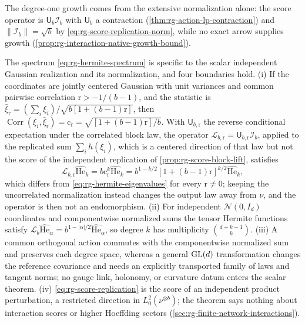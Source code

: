 The degree-one growth comes from the extensive normalization alone: the score
operator is \(\mathsf U_b\mathscr I_b\) with \(\mathsf U_b\) a contraction
(\cref{thm:rg-action-lp-contraction}) and
\(\lVert\mathscr I_b\rVert=\sqrt b\) by \eqref{eq:rg-score-replication-norm},
while no exact arrow supplies growth
(\cref{prop:rg-interaction-native-growth-bound}).

The spectrum \eqref{eq:rg-hermite-spectrum} is specific to the scalar
independent Gaussian realization and its normalization, and four boundaries
hold. (i) If the coordinates are jointly centered Gaussian with unit variances
and common pairwise correlation \(\mathrm r>-1/(b-1)\), and the statistic is
\(\bar\xi_{\mathrm r}=(\sum_i\xi_i)/\sqrt{b[1+(b-1)\mathrm r]}\), then
\(\operatorname{Corr}(\xi_i,\bar\xi_{\mathrm r})=\mathrm c_{\mathrm r}=\sqrt{[1+(b-1)\mathrm r]/b}\).
With \(\mathsf U_{b,\mathrm r}\) the reverse conditional expectation under the
correlated block law, the operator
\(\mathscr L_{b,\mathrm r}=\mathsf U_{b,\mathrm r}\mathscr I_b\), applied to the
replicated sum \(\sum_ih(\xi_i)\), which is a centered direction of that law but
not the score of the independent replication of
\cref{prop:rg-score-block-lift}, satisfies
\begin{equation}
\mathscr L_{b,\mathrm r}\widehat{\mathrm{He}}_k=b\mathrm c_{\mathrm r}^k\widehat{\mathrm{He}}_k
=b^{1-k/2}\left[1+(b-1)\mathrm r\right]^{k/2}\widehat{\mathrm{He}}_k,
\label{eq:rg-hermite-correlated}
\end{equation}
which differs from \eqref{eq:rg-hermite-eigenvalues} for every
\(\mathrm r\neq0\); keeping the uncorrelated normalization instead changes the
output law away from \(\nu\), and the operator is then not an endomorphism.
(ii) For independent \(\mathcal N(0,I_d)\) coordinates and componentwise normalized
sums the tensor Hermite functions satisfy
\(\mathscr L_b\widehat{\mathrm{He}}_\alpha=b^{1-\lvert\alpha\rvert/2}\widehat{\mathrm{He}}_\alpha\), so degree \(k\)
has multiplicity \(\binom{d+k-1}{k}\). (iii) A common orthogonal action
commutes with the componentwise normalized sum and preserves each degree
space, whereas a general \(\mathrm{GL}(d)\) transformation changes the reference
covariance and needs an explicitly transported family of laws and tangent
norms; no gauge link, holonomy, or curvature datum enters the scalar theorem.
(iv) \eqref{eq:rg-score-replication} is the score of an independent product
perturbation, a restricted direction in \(L^2_0(\nu^{\otimes b})\); the
theorem says nothing about interaction scores or higher Hoeffding sectors
(\cref{sec:rg-finite-network-interactions}). 


